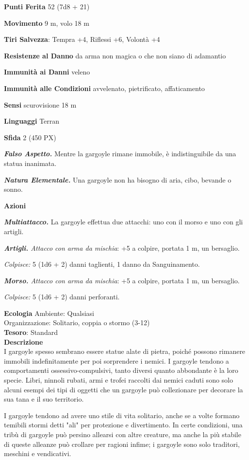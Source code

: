 \begin{multicols}{2}
	\textbf{Punti Ferita} 52 (7d8 + 21)

	\textbf{Movimento} 9 m, volo 18 m

	\textbf{Tiri Salvezza}: Tempra +4, Riflessi +6, Volontà +4

	\textbf{Resistenze al Danno} da arma non magica o che non siano di adamantio

	\textbf{Immunità ai Danni} veleno

	\textbf{Immunità alle Condizioni} avvelenato, pietrificato, affaticamento

	\textbf{Sensi} scurovisione 18 m

	\textbf{Linguaggi} Terran

	\textbf{Sfida} 2 (450 PX)

	\textit{\textbf{Falso Aspetto.}} Mentre la gargoyle rimane immobile, è indistinguibile da una statua inanimata.

	\textit{\textbf{Natura Elementale.}} Una gargoyle non ha bisogno di aria, cibo, bevande o sonno.

	\textbf{Azioni}

	\textit{\textbf{Multiattacco.}} La gargoyle effettua due attacchi: uno con il morso e uno con gli artigli.

	\textit{\textbf{Artigli.} Attacco con arma da mischia}: +5 a colpire, portata 1 m, un bersaglio.

	\textit{Colpisce:} 5 (1d6 + 2) danni taglienti, 1 danno da Sanguinamento.

	\textit{\textbf{Morso.} Attacco con arma da mischia}: +5 a colpire, portata 1 m, un bersaglio.

	\textit{Colpisce:} 5 (1d6 + 2) danni perforanti.

	\textbf{Ecologia}
	Ambiente: Qualsiasi\\
	Organizzazione: Solitario, coppia o stormo (3-12)\\
	\textbf{Tesoro}: Standard\\
	\textbf{Descrizione}\\
	I gargoyle spesso sembrano essere statue alate di pietra, poiché possono rimanere immobili indefinitamente per poi sorprendere i nemici. I gargoyle tendono a comportamenti ossessivo-compulsivi, tanto diversi quanto abbondante è la loro specie. Libri, ninnoli rubati, armi e trofei raccolti dai nemici caduti sono solo alcuni esempi dei tipi di oggetti che un gargoyle può collezionare per decorare la sua tana e il suo territorio.

	I gargoyle tendono ad avere uno stile di vita solitario, anche se a volte formano temibili stormi detti "ali" per protezione e divertimento. In certe condizioni, una tribù di gargoyle può persino allearsi con altre creature, ma anche la più stabile di queste alleanze può crollare per ragioni infime; i gargoyle sono solo traditori, meschini e vendicativi.


\end{multicols}
